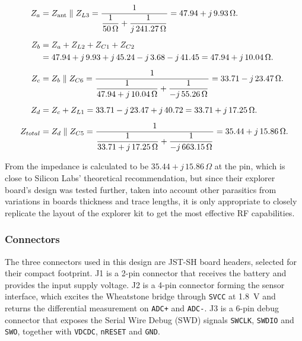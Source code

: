 \begin{align}
Z_a &= Z_{\text{ant}} \parallel Z_{L3} = \frac{1}{\dfrac{1}{50\,\Omega} + \dfrac{1}{j\,241.27\,\Omega}} = 47.94 + j\,9.93\,\Omega \label{eq:Za}.\\[0.5em]
Z_b &= Z_a + Z_{L2} + Z_{C1} + Z_{C2} \notag\\
&= 47.94 + j\,9.93 + j\,45.24 - j\,3.68 - j\,41.45 = 47.94 + j\,10.04\,\Omega \label{eq:Zb}.\\[0.5em]
Z_c &= Z_b \parallel Z_{C6} = \frac{1}{\dfrac{1}{47.94 + j\,10.04\,\Omega} + \dfrac{1}{-j\,55.26\,\Omega}} = 33.71 - j\,23.47\,\Omega \label{eq:Zc}.\\[0.5em]
Z_d &= Z_c + Z_{L1} = 33.71 - j\,23.47 + j\,40.72 = 33.71 + j\,17.25\,\Omega \label{eq:Zd}.\\[0.5em]
Z_{total} &= Z_d \parallel Z_{C5} = \frac{1}{\dfrac{1}{33.71 + j\,17.25\,\Omega} + \dfrac{1}{-j\,663.15\,\Omega}} = 35.44 + j\,15.86\,\Omega \label{eq:Ztotal}.
\end{align}

From  the impedance is calculated to be $35.44 + j\,15.86\,\Omega$ at the pin, which is close to Silicon Labs' theoretical recommendation, but since their explorer board's design was tested further, taken into account other parasitics from variations in boards thickness and trace lengths, it is only appropriate to closely replicate the layout of the explorer kit to get the most effective RF capabilities.

\subsubsection{Connectors}
The three connectors used in this design are JST-SH board headers, selected for their compact footprint. J1 is a 2-pin connector that receives the battery and provides the input supply voltage. J2 is a 4-pin connector forming the sensor interface, which excites the Wheatstone bridge through \texttt{SVCC} at \SI{1.8}{\volt} and returns the differential measurement on \texttt{ADC+} and \texttt{ADC-}. J3 is a 6-pin debug connector that exposes the Serial Wire Debug (SWD) signals \texttt{SWCLK}, \texttt{SWDIO} and \texttt{SWO}, together with \texttt{VDCDC}, \texttt{nRESET} and \texttt{GND}.
 
